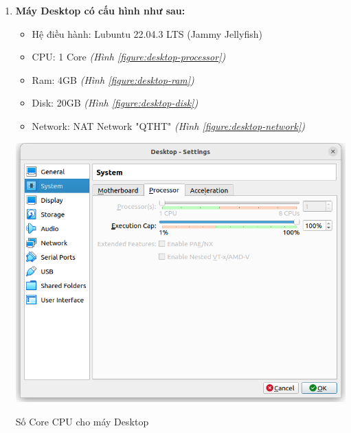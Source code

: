 \documentclass[a4paper, 11pt]{article}
\begin{document}
\begin{enumerate}
    \item \textbf{Máy Desktop có cấu hình như sau:}
          \begin{itemize}
              \item Hệ điều hành: Lubuntu 22.04.3 LTS (Jammy Jellyfish)
              \item CPU: 1 Core \textit{(Hình \ref{figure:desktop-processor})}
              \item Ram: 4GB \textit{(Hình \ref{figure:desktop-ram})}
              \item Disk: 20GB \textit{(Hình \ref{figure:desktop-disk})}
              \item Network: NAT Network "QTHT" \textit{(Hình \ref{figure:desktop-network})}
          \end{itemize}

          \begin{minipage}
              {\linewidth}
              \captionsetup{type=figure}
              \centering
              \includegraphics[width=\linewidth]{images/desktop-processor.png}
              \caption{Số Core CPU cho máy Desktop}
              \label{figure:desktop-processor}
          \end{minipage}


\end{enumerate}
\end{document}
